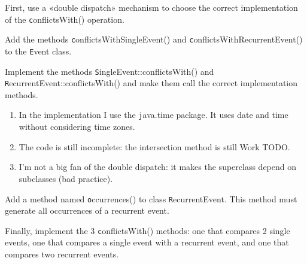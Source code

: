 \documentclass[a4paper,11pt]{memoir}
\newcommand{\code}[1]{{\texttt #1}}
\begin{document}
\begin{exercise}
	First, use a «double dispatch» mechanism to choose the correct implementation of the \code{conflictsWith()} operation.
	
	\begin{inparaenum}[(A)]
		\item Add the methods \code{conflictsWithSingleEvent()} and \code{conflictsWithRecurrentEvent()} to the \code{Event} class.
		\item Implement the methods \code{SingleEvent::conflictsWith()} and \code{RecurrentEvent::conflictsWith()} and make them call the correct implementation methods.
	\end{inparaenum}
\end{exercise}

\begin{solution}
\begin{enumerate}
	\item In the implementation I use the \code{java.time} package. It uses date and time without considering time zones.
	\item The code is still incomplete: the intersection method is still Work TODO.
	\item I'm not a big fan of the double dispatch: it makes the superclass depend on subclasses (bad practice).
	
\end{enumerate}
\end{solution}

\begin{exercise}
Add a method named \code{occurrences()} to class \code{RecurrentEvent}.
This method must generate all occurrences of a recurrent event. 
\end{exercise}

\begin{solution}






\end{solution}

\begin{exercise}
Finally, implement the 3 \code{conflictsWith()} methods: one that compares 2 single events, one that compares a single event with
a recurrent event, and one that compares two recurrent events.
\end{exercise}
\end{document}

